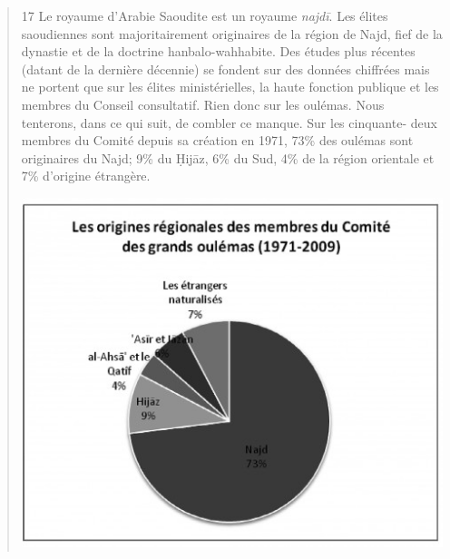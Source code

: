 \begin{quote}
17 Le royaume d'Arabie Saoudite est un royaume \emph{najdī}. Les élites
saoudiennes sont majoritairement originaires de la région de Najd, fief
de la dynastie et de la doctrine hanbalo-wahhabite. Des études plus
récentes (datant de la dernière décennie) se fondent sur des données
chiffrées mais ne portent que sur les élites ministérielles, la haute
fonction publique et les membres du Conseil consultatif. Rien donc sur
les oulémas. Nous tenterons, dans ce qui suit, de combler ce manque. Sur
les cinquante- deux membres du Comité depuis sa création en 1971, 73\%
des oulémas sont originaires du Najd; 9\% du Ḥijāz, 6\% du Sud, 4\% de
la région orientale et 7\% d'origine étrangère.
\begin{marginfigure}
\includegraphics[width=1.2\textwidth]{CourantsIslamContemporain/ImagesCourantsIslamContemporain/image11.jpeg}
\end{marginfigure}
 


\end{quote}
